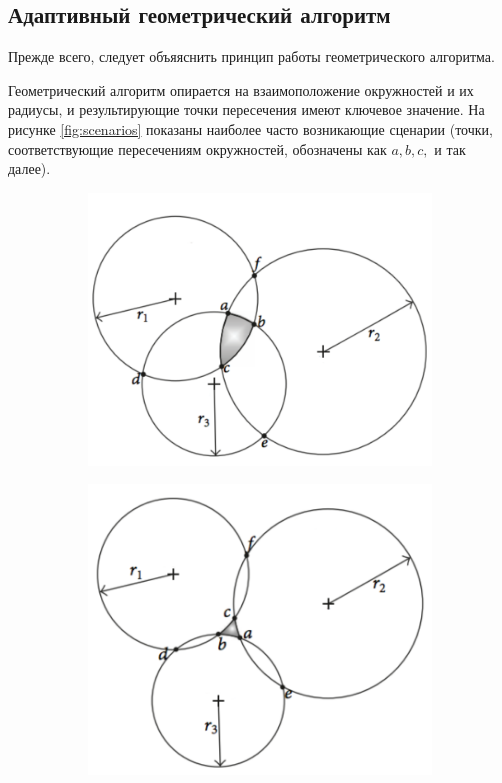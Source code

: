 \subsection{Адаптивный геометрический алгоритм}

Прежде всего, следует объяяснить принцип работы геометрического алгоритма.

Геометрический алгоритм опирается на взаимоположение окружностей и их радиусы, и результирующие точки пересечения имеют ключевое значение. На рисунке \ref{fig:scenarios} показаны наиболее часто возникающие сценарии (точки, соответствующие пересечениям окружностей, обозначены как $a, b, c,$ и так далее). 

\begin{figure}
    \centering
    \begin{subfigure}[ht]{0.4\textwidth}
        \includegraphics[width=\textwidth]{img/circlesInter}
        \caption{}
        \label{fig:inter}
    \end{subfigure}
    \begin{subfigure}[ht]{0.4\textwidth}
        \includegraphics[width=\textwidth]{img/circlesOuter}

\end{subfigure}
\end{figure}
